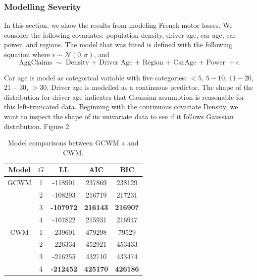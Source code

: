 \documentclass[11pt,letterpaper]{article}
\numberwithin{equation}{section}
\numberwithin{equation}{section}
\numberwithin{equation}{section}
\begin{document}
\subsubsection{Modelling Severity}
In this section, we show the results from modeling French motor losses. We consider the following covariates: population density, driver age, car age, car power, and regions. %
The model that was fitted is defined with the following equation where $\epsilon \sim \mathcal{N}(0,\sigma)$, and
$$ \text{ AggClaims } \sim  \text{ Density + Driver Age + Region + CarAge + Power }+ \epsilon.$$%

Car age is model as categorical variable with five categories: $<5$, $5-10$, $11-20$, $21-30$, $>30$. Driver age is modelled as a continuous predictor. The  shape of the distribution for driver age indicates that Gaussian assumption is reasonable for this left-truncated data. %
Beginning with the continuous covariate Density, we want to inspect the shape of its univariate data to see if it follows Gaussian distribution. %
Figure 2 %


\begin{table}[!htb]
\begin{center}
     	\caption{Model comparisons between GCWM a and CWM.}
        \begin{tabular}{ccccc}
        		\hline\hline	
				Model & $G$ & LL & AIC    & BIC    \\
				\hline
			GCWM & 1& -118901 & 237869 & 238129  \\
						& 2& -108293  & 216719 & 217231 \\
						&3  &  \textbf{-107972 } & \textbf{216143} & \textbf{216907}\\
						& 4 & -107822  & 215931 &  216947 \\
				CWM &  1  & -239601 &  479298  & 79529 \\
				& 2 & -226334 & 452921 & 453433  \\
				& 3 & -216255  & 432710 & 433474  \\
				& 4 & \textbf{-212452}   &\textbf{425170}&\textbf{426186}\\
				\hline\hline
\end{tabular}
\end{center}
\end{table}
\end{document}
